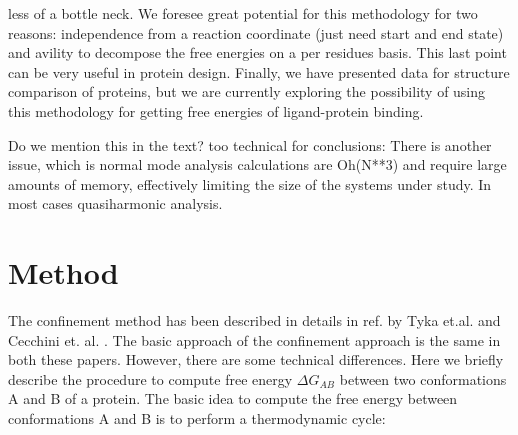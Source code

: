 \documentclass[12pt]{article}
\newcommand{\Alberto}[1]{\color{ForestGreen}#1\normalcolor }
\begin{document}
less of a bottle neck.
We foresee great potential for this methodology for two reasons: independence from a reaction
coordinate (just need start and end state) and avility to decompose the free energies on a per
residues basis. This last point can be very useful in protein design. Finally, we have presented
data for structure comparison of proteins, but we are currently exploring the possibility of
using this methodology for getting free energies of ligand-protein binding.

\Alberto{Do we mention this in the text? too technical for conclusions:
There is another issue, which is normal mode
analysis calculations are Oh(N**3) and require large amounts of memory, effectively limiting the
size of the systems under study. In most cases quasiharmonic analysis.
}

\section{Method}

The confinement method has been described in details in ref. by Tyka et.al. \cite{Tyka2006} and
Cecchini et. al. \cite{Cecchini2009}. The basic approach of the confinement approach is the same in
both these papers. However, there are some technical differences. Here we briefly describe the
procedure to compute free energy $\Delta G_{AB}$ between two conformations A and B of a protein. The
basic idea to compute the free energy between conformations A and B is to perform a thermodynamic
cycle:
\end{document}
